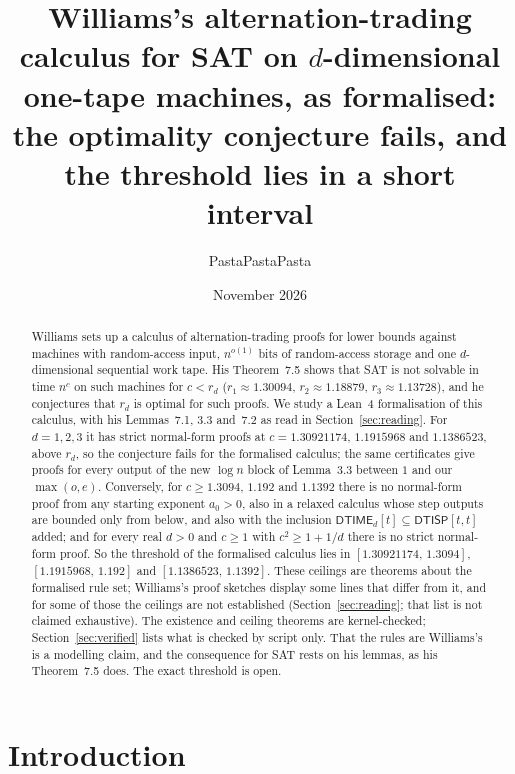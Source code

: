 \documentclass[11pt]{article}
\title{Williams's alternation-trading calculus for SAT on $d$-dimensional one-tape machines, as formalised:\\ the optimality conjecture fails, and the threshold lies in a short interval}
\author{PastaPastaPasta}
\date{November 2026}
\theoremstyle{definition}
\newcommand{\DTIME}{\mathsf{DTIME}}
\newcommand{\DTISP}{\mathsf{DTISP}}
\begin{document}
\maketitle

\begin{abstract}
Williams \cite[\S7]{W13} sets up a calculus of alternation-trading proofs for lower bounds against machines with random-access input, $n^{o(1)}$ bits of random-access storage and one $d$-dimensional sequential work tape. His Theorem~7.5 shows that SAT is not solvable in time $n^c$ on such machines for $c<r_d$ ($r_1\approx1.30094$, $r_2\approx1.18879$, $r_3\approx1.13728$), and he conjectures that $r_d$ is optimal for such proofs. We study a Lean~4 formalisation of this calculus, with his Lemmas~7.1, 3.3 and~7.2 as read in Section~\ref{sec:reading}. For $d=1,2,3$ it has strict normal-form proofs at $c=1.30921174$, $1.1915968$ and $1.1386523$, above $r_d$, so the conjecture fails for the formalised calculus; the same certificates give proofs for every output of the new $\log n$ block of Lemma~3.3 between $1$ and our $\max(o,e)$. Conversely, for $c\ge1.3094$, $1.192$ and $1.1392$ there is no normal-form proof from any starting exponent $a_0>0$, also in a relaxed calculus whose step outputs are bounded only from below, and also with the inclusion $\DTIME_d[t]\subseteq\DTISP[t,t]$ added; and for every real $d>0$ and $c\ge1$ with $c^2\ge1+1/d$ there is no strict normal-form proof. So the threshold of the formalised calculus lies in $[1.30921174,\,1.3094]$, $[1.1915968,\,1.192]$ and $[1.1386523,\,1.1392]$. These ceilings are theorems about the formalised rule set; Williams's proof sketches display some lines that differ from it, and for some of those the ceilings are not established (Section~\ref{sec:reading}; that list is not claimed exhaustive). The existence and ceiling theorems are kernel-checked; Section~\ref{sec:verified} lists what is checked by script only. That the rules are Williams's is a modelling claim, and the consequence for SAT rests on his lemmas, as his Theorem~7.5 does. The exact threshold is open.
\end{abstract}

\section{Introduction}
\end{document}
